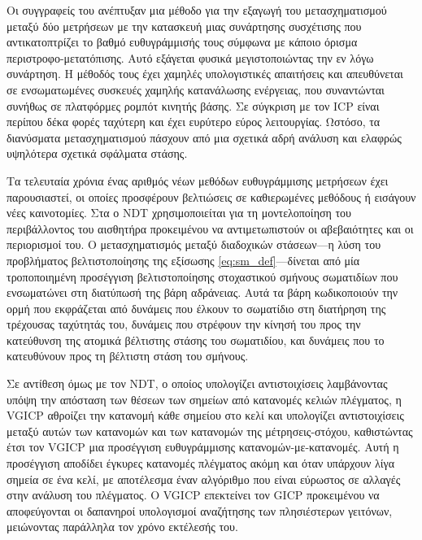 Οι συγγραφείς του \cite{Konecny2016} ανέπτυξαν μια μέθοδο για την εξαγωγή του
μετασχηματισμού μεταξύ δύο μετρήσεων με την κατασκευή μιας συνάρτησης
συσχέτισης που αντικατοπτρίζει το βαθμό ευθυγράμμισής τους σύμφωνα με κάποιο
όρισμα περιστροφο-μετατόπισης. Αυτό εξάγεται φυσικά μεγιστοποιώντας την εν λόγω
συνάρτηση. Η μέθοδός τους έχει χαμηλές υπολογιστικές απαιτήσεις και απευθύνεται
σε ενσωματωμένες συσκευές χαμηλής κατανάλωσης ενέργειας, που συναντώνται συνήθως
σε πλατφόρμες ρομπότ κινητής βάσης.  Σε σύγκριση με τον ICP είναι περίπου δέκα
φορές ταχύτερη και έχει ευρύτερο εύρος λειτουργίας. Ωστόσο, τα διανύσματα
μετασχηματισμού πάσχουν από μια σχετικά αδρή ανάλυση και ελαφρώς υψηλότερα
σχετικά σφάλματα στάσης.

Τα τελευταία χρόνια ένας αριθμός νέων μεθόδων ευθυγράμμισης μετρήσεων έχει
παρουσιαστεί, οι οποίες προσφέρουν βελτιώσεις σε καθιερωμένες μεθόδους ή
εισάγουν νέες καινοτομίες.  Στα  \cite{Bouraine2020a,Bouraine2021} ο NDT
χρησιμοποιείται για τη μοντελοποίηση του περιβάλλοντος του αισθητήρα
προκειμένου να αντιμετωπιστούν οι αβεβαιότητες και οι περιορισμοί του. Ο
μετασχηματισμός μεταξύ διαδοχικών στάσεων---η λύση του προβλήματος
βελτιστοποίησης της εξίσωσης \ref{eq:sm_def}---δίνεται από μία τροποποιημένη
προσέγγιση βελτιστοποίησης στοχαστικού σμήνους σωματιδίων που ενσωματώνει στη
διατύπωσή της βάρη αδράνειας. Αυτά τα βάρη κωδικοποιούν την ορμή που εκφράζεται
από δυνάμεις που έλκουν το σωματίδιο στη διατήρηση της τρέχουσας ταχύτητάς του,
δυνάμεις που στρέφουν την κίνησή του προς την κατεύθυνση της ατομικά βέλτιστης
στάσης του σωματιδίου, και δυνάμεις που το κατευθύνουν προς τη βέλτιστη στάση
του σμήνους.

Σε αντίθεση όμως με τον NDT, ο οποίος υπολογίζει αντιστοιχίσεις λαμβάνοντας
υπόψη την απόσταση των θέσεων των σημείων από κατανομές κελιών πλέγματος, η
VGICP \cite{Koide2021a} αθροίζει την κατανομή κάθε σημείου στο κελί και
υπολογίζει αντιστοιχίσεις μεταξύ αυτών των κατανομών και των κατανομών της
μέτρησεις-στόχου, καθιστώντας έτσι τον VGICP μια προσέγγιση ευθυγράμμισης
κατανομών-με-κατανομές. Αυτή η προσέγγιση αποδίδει έγκυρες κατανομές πλέγματος
ακόμη και όταν υπάρχουν λίγα σημεία σε ένα κελί, με αποτέλεσμα έναν αλγόριθμο
που είναι εύρωστος σε αλλαγές στην ανάλυση του πλέγματος. Ο VGICP επεκτείνει
τον GICP \cite{Segal2009a} προκειμένου να αποφεύγονται οι δαπανηροί υπολογισμοί
αναζήτησης των πλησιέστερων γειτόνων, μειώνοντας παράλληλα τον χρόνο εκτέλεσής
του.

